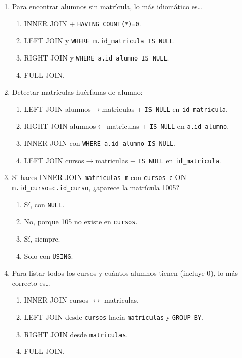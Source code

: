 \documentclass[11pt,a4paper]{article}
\begin{document}
\begin{enumerate}[label=\textbf{\arabic*.}]
\item Para encontrar alumnos sin matrícula, lo más idiomático es…
  \begin{enumerate}[label=\Alph*.]
    \item INNER JOIN + \texttt{HAVING COUNT(*)=0}.
    \item LEFT JOIN y \texttt{WHERE m.id\_matricula IS NULL}.
    \item RIGHT JOIN y \texttt{WHERE a.id\_alumno IS NULL}.
    \item FULL JOIN.
  \end{enumerate}

\item Detectar matrículas huérfanas de alumno:
  \begin{enumerate}[label=\Alph*.]
    \item LEFT JOIN alumnos$\to$matriculas + \texttt{IS NULL} en \texttt{id\_matricula}.
    \item RIGHT JOIN alumnos$\leftarrow$matriculas + \texttt{IS NULL} en \texttt{a.id\_alumno}.
    \item INNER JOIN con \texttt{WHERE a.id\_alumno IS NULL}.
    \item LEFT JOIN cursos$\to$matriculas + \texttt{IS NULL} en \texttt{id\_matricula}.
  \end{enumerate}

\item Si haces INNER JOIN \texttt{matriculas m} con \texttt{cursos c} ON \texttt{m.id\_curso=c.id\_curso}, ¿aparece la matrícula 1005?
  \begin{enumerate}[label=\Alph*.]
    \item Sí, con \texttt{NULL}.
    \item No, porque 105 no existe en \texttt{cursos}.
    \item Sí, siempre.
    \item Solo con \texttt{USING}.
  \end{enumerate}

\item Para listar todos los cursos y cuántos alumnos tienen (incluye 0), lo más correcto es…
  \begin{enumerate}[label=\Alph*.]
    \item INNER JOIN cursos $\leftrightarrow$ matriculas.
    \item LEFT JOIN desde \texttt{cursos} hacia \texttt{matriculas} y \texttt{GROUP BY}.
    \item RIGHT JOIN desde \texttt{matriculas}.
    \item FULL JOIN.
  \end{enumerate}


\end{enumerate}
\end{document}
